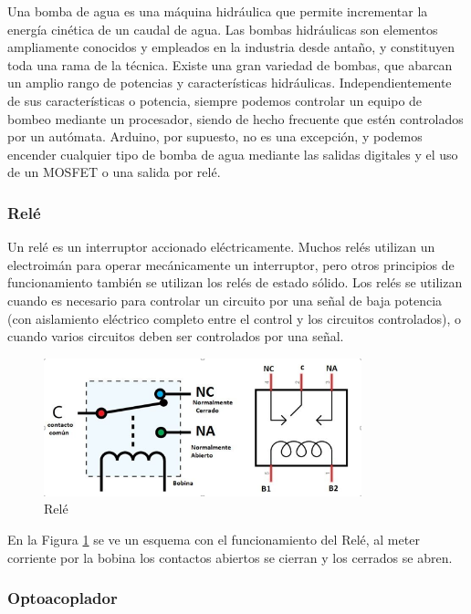 \documentclass[a4paper]{article}
\begin{document}
Una bomba de agua es una máquina hidráulica que permite incrementar la energía cinética de un caudal de agua.
Las bombas hidráulicas son elementos ampliamente conocidos y empleados en la industria desde antaño, y constituyen toda una rama de la técnica. Existe una gran variedad de bombas, que abarcan un amplio rango de potencias y características hidráulicas.
Independientemente de sus características o potencia, siempre podemos controlar un equipo de bombeo mediante un procesador, siendo de hecho frecuente que estén controlados por un autómata. Arduino, por supuesto, no es una excepción, y podemos encender cualquier tipo de bomba de agua mediante las salidas digitales y el uso de un MOSFET o una salida por relé.

\subsubsection*{Relé}

Un relé es un interruptor accionado eléctricamente. Muchos relés utilizan un electroimán para operar mecánicamente un interruptor, pero otros principios de funcionamiento también se utilizan los relés de estado sólido. Los relés se utilizan cuando es necesario para controlar un circuito por una señal de baja potencia (con aislamiento eléctrico completo entre el control y los circuitos controlados), o cuando varios circuitos deben ser controlados por una señal.


\begin{figure}[h]\centering
    \includegraphics[height=4cm]{rele.png}
    \caption{Relé}
    \label{fig:Rele}
\end{figure}

En la Figura \ref{fig:Rele} se ve un esquema con el funcionamiento del Relé, al meter corriente por la bobina los contactos abiertos se cierran y los cerrados se abren.

\subsubsection*{Optoacoplador}
\end{document}

